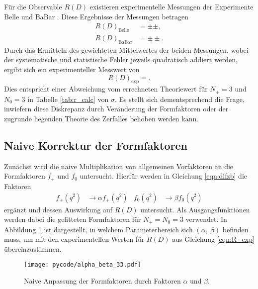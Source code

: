 Für die Observable $R(D)$ existieren experimentelle Messungen der Experimente Belle \cite{PhysRevD.92.072014} und BaBar \cite{PhysRevLett.109.101802}.
Diese Ergebnisse der Messungen betragen
\begin{align*}
  R(D)_\text{Belle} &=  \pm  \pm  ,\\
  R(D)_\text{BaBar} &=  \pm  \pm .
\end{align*}
Durch das Ermitteln des gewichteten Mittelwertes der beiden Messungen, wobei der systematische und statistische Fehler jeweils quadratisch addiert werden, ergibt sich ein experimenteller Messwert von
\begin{equation}
  \label{eqn:R_exp}
  R(D)_\text{exp} = .
\end{equation}
Dies entspricht einer Abweichung vom errechneten Theoriewert für $N_+=\num{3}$ und $N_0=\num{3}$ in Tabelle \ref{tab:r_calc} von $\sigma$.
Es stellt sich dementsprechend die Frage, inwiefern diese Diskrepanz durch Veränderung der Formfaktoren oder der zugrunde liegenden Theorie des Zerfalles behoben werden kann.

\subsection{Naive Korrektur der Formfaktoren}

Zunächst wird die naive Multiplikation von allgemeinen Vorfaktoren an die Formfaktoren $f_+$ und $f_0$ untersucht.
Hierfür werden in Gleichung \eqref{eqn:difzb} die Faktoren
\begin{align*}
  f_+(q^2) &\to \alpha f_+(q^2) & f_0(q^2) &\to \beta f_0(q^2)
\end{align*}
ergänzt und dessen Auswirkung auf $R(D)$ untersucht.
Als Ausgangsfunktionen werden dabei die gefitteten Formfaktoren für $N_+ = N_0 = \num{3}$ verwendet.
In Abbildung \ref{fig:alpha_beta} ist dargestellt, in welchem Parameterbereich sich $(\alpha, \: \beta)$ befinden muss, um mit den experimentellen Werten für $R(D)$ aus Gleichung \eqref{eqn:R_exp} übereinzustimmen.
\begin{figure}
  \centering
  \texttt{[image: pycode/alpha\_beta\_33.pdf]}
  \caption{Naive Anpassung der Formfaktoren durch Faktoren $\alpha$ und $\beta$.}
  \label{fig:alpha_beta}
\end{figure}

